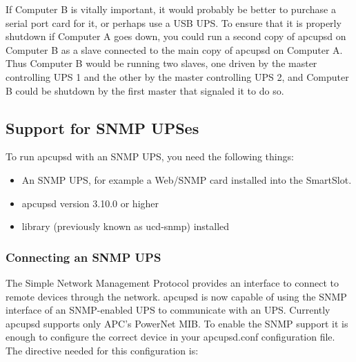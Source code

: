 {{{{{{{{{{If Computer B is vitally important, it would probably be better to purchase a
serial port card for it, or perhaps use a USB UPS. To ensure that it is
properly shutdown if Computer A goes down, you could run a second copy of
apcupsd on Computer B as a slave connected to the main copy of apcupsd on
Computer A. Thus Computer B would be running two slaves, one driven by the
master controlling UPS 1 and the other by the master controlling UPS 2, and
Computer B could be shutdown by the first master that signaled it to do so. 

\label{Support-for-SNMP-UPSes}

\subsection*{Support for SNMP UPSes}

\label{index-SNMP-162}
 To run apcupsd with an SNMP UPS, you need the
following things:  

\begin{itemize}
\item An SNMP UPS, for example a Web/SNMP card installed into the SmartSlot.  
\item apcupsd version 3.10.0 or higher  
\item 
{} library (previously known as
ucd-snmp) installed 
\end{itemize}

\label{Connecting-an-SNMP-UPS}

\subsubsection*{Connecting an SNMP UPS}

\label{index-SNMP_002c-Connecting-163}
The Simple Network Management Protocol provides an interface to connect to
remote devices through the network. apcupsd is now capable of using the SNMP
interface of an SNMP-enabled UPS to communicate with an UPS. Currently apcupsd
supports only APC's PowerNet MIB. To enable the SNMP support it is enough to
configure the correct device in your apcupsd.conf configuration file. The
directive needed for this configuration is: 

\footnotesize
\begin{verbatim}
     

\end{verbatim}}}}}}}}}}}
